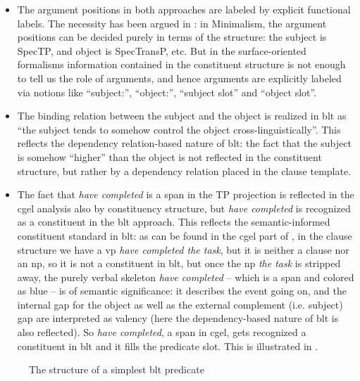 \documentclass[UTF8, a4paper, oneside, scheme=plain]{ctexart}
\newcommand*{\corpus}[1]{\emph{#1}}
\begin{document}
\begin{itemize}
    \item The argument positions in both approaches are labeled by explicit functional labels.
    The necessity has been argued in :
    in Minimalism, the argument positions can be decided purely in terms of the structure:
    the subject is SpecTP, and object is SpecTransP, etc.
    But in the surface-oriented formalisms 
    information contained in the constituent structure
    is not enough to tell us the role of arguments,
    and hence arguments are explicitly labeled via notions like 
    ``subject:'', ``object:'', ``subject slot'' and ``object slot''.
    \item The binding relation between the subject and the object 
    is realized in \ac{blt} as ``the subject tends to somehow control the object cross-linguistically''.
    This reflects the dependency relation-based nature of \ac{blt}:
    the fact that the subject is somehow ``higher'' than the object 
    is not reflected in the constituent structure, 
    but rather by a dependency relation placed in the clause template.
    \item The fact that \corpus{have completed} is a span in the TP projection 
    is reflected in the \ac{cgel} analysis also by constituency structure,
    but \corpus{have completed} is recognized as a constituent in the \ac{blt} approach.
    This reflects the semantic-informed constituent standard in \ac{blt}:
    as can be found in the \ac{cgel} part of ,
    in the clause structure we have a \ac{vp} \corpus{have completed the task},
    but it is neither a clause nor an \ac{np},
    so it is not a constituent in \ac{blt},
    but once the \ac{np} \corpus{the task} is stripped away,
    the purely verbal skeleton \corpus{have completed} -- which is a span and colored as blue --
    is of semantic significance: 
    it describes the event going on, 
    and the internal gap for the object as well as the external complement (i.e. subject) gap 
    are interpreted as valency (here the dependency-based nature of \ac{blt} is also reflected).
    So \corpus{have completed}, a span in \ac{cgel}, gets recognized a constituent in \ac{blt} 
    and it fills the predicate slot.
    This is illustrated in .
\end{itemize}

\begin{figure}
    \centering
    
    \caption{The structure of a simplest \ac{blt} predicate}
    \label{fig:blt-predicate-simple}
\end{figure}
\end{document}
